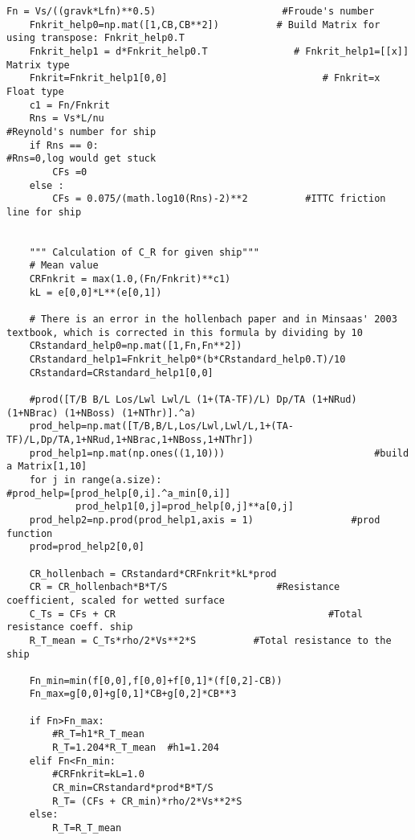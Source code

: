 \begin{lstlisting}[caption=Testing codes (\autoref{TestResults}), label=TestCodes]
    Fn = Vs/((gravk*Lfn)**0.5) 	                    #Froude's number
    Fnkrit_help0=np.mat([1,CB,CB**2])          # Build Matrix for using transpose: Fnkrit_help0.T
    Fnkrit_help1 = d*Fnkrit_help0.T               # Fnkrit_help1=[[x]]   Matrix type
    Fnkrit=Fnkrit_help1[0,0]                           # Fnkrit=x                  Float type
    c1 = Fn/Fnkrit
    Rns = Vs*L/nu						                          #Reynold's number for ship
    if Rns == 0:                                                      #Rns=0,log would get stuck
        CFs =0
    else :
        CFs = 0.075/(math.log10(Rns)-2)**2			#ITTC friction line for ship

   
    """ Calculation of C_R for given ship"""
    # Mean value
    CRFnkrit = max(1.0,(Fn/Fnkrit)**c1)
    kL = e[0,0]*L**(e[0,1])

    # There is an error in the hollenbach paper and in Minsaas' 2003 textbook, which is corrected in this formula by dividing by 10
    CRstandard_help0=np.mat([1,Fn,Fn**2])
    CRstandard_help1=Fnkrit_help0*(b*CRstandard_help0.T)/10
    CRstandard=CRstandard_help1[0,0]

    #prod([T/B B/L Los/Lwl Lwl/L (1+(TA-TF)/L) Dp/TA (1+NRud) (1+NBrac) (1+NBoss) (1+NThr)].^a)
    prod_help=np.mat([T/B,B/L,Los/Lwl,Lwl/L,1+(TA-TF)/L,Dp/TA,1+NRud,1+NBrac,1+NBoss,1+NThr])
    prod_help1=np.mat(np.ones((1,10)))                          #build a Matrix[1,10]
    for j in range(a.size):                                            #prod_help=[prod_help[0,i].^a_min[0,i]]
            prod_help1[0,j]=prod_help[0,j]**a[0,j]
    prod_help2=np.prod(prod_help1,axis = 1)                 #prod function
    prod=prod_help2[0,0]

    CR_hollenbach = CRstandard*CRFnkrit*kL*prod
    CR = CR_hollenbach*B*T/S  			       #Resistance coefficient, scaled for wetted surface
    C_Ts = CFs + CR                                     #Total resistance coeff. ship 
    R_T_mean = C_Ts*rho/2*Vs**2*S		   #Total resistance to the ship

    Fn_min=min(f[0,0],f[0,0]+f[0,1]*(f[0,2]-CB))
    Fn_max=g[0,0]+g[0,1]*CB+g[0,2]*CB**3

    if Fn>Fn_max:
        #R_T=h1*R_T_mean 
        R_T=1.204*R_T_mean  #h1=1.204
    elif Fn<Fn_min:
        #CRFnkrit=kL=1.0
        CR_min=CRstandard*prod*B*T/S
        R_T= (CFs + CR_min)*rho/2*Vs**2*S
    else:
        R_T=R_T_mean


\end{lstlisting}
